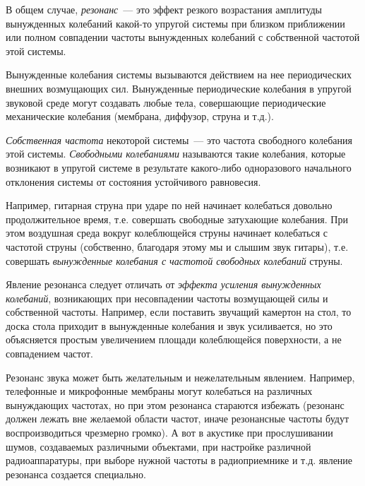 \documentclass[oneside, final, 14pt]{extreport}
\begin{document}
В общем случае, {\itshape резонанс}~--- это эффект резкого возрастания амплитуды вынужденных колебаний какой-то упругой системы при близком приближении или полном совпадении частоты вынужденных колебаний с собственной частотой этой системы.

Вынужденные колебания системы вызываются действием на нее периодических внешних возмущающих сил. Вынужденные периодические колебания в упругой звуковой среде могут создавать любые тела, совершающие периодические механические колебания (мембрана, диффузор, струна и т.д.).

{\itshape Собственная частота} некоторой системы~--- это частота свободного колебания этой системы. {\itshape Свободными колебаниями} называются такие колебания, которые возникают в упругой системе в результате какого-либо одноразового начального отклонения системы от состояния устойчивого равновесия.

Например, гитарная струна при ударе по ней начинает колебаться довольно продолжительное время, т.е. совершать свободные затухающие колебания. При этом воздушная среда вокруг колеблющейся струны начинает колебаться с частотой струны (собственно, благодаря этому мы и слышим звук гитары), т.е. совершать {\itshape вынужденные колебания с частотой свободных колебаний} струны.

Явление резонанса следует отличать от {\itshape эффекта усиления вынужденных колебаний}, возникающих при несовпадении частоты возмущающей силы и собственной частоты. Например, если поставить звучащий камертон на стол, то доска стола приходит в вынужденные колебания и звук усиливается, но это объясняется простым увеличением площади колеблющейся поверхности, а не совпадением частот.

Резонанс звука может быть желательным и нежелательным явлением. Например, телефонные и микрофонные мембраны могут колебаться на различных вынуждающих частотах, но при этом резонанса стараются избежать (резонанс должен лежать вне желаемой области частот, иначе резонансные частоты будут воспроизводиться чрезмерно громко). А вот в акустике при прослушивании шумов, создаваемых различными объектами, при настройке различной радиоаппаратуры, при выборе нужной частоты в радиоприемнике и т.д. явление резонанса создается специально.
\end{document}
